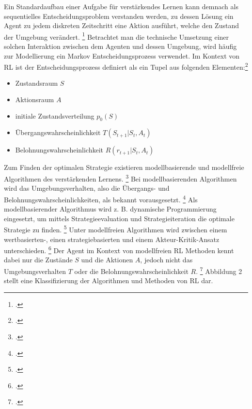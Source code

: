 Ein Standardaufbau einer Aufgabe für verstärkendes Lernen kann demnach als sequentielles Entscheidungsproblem verstanden werden, zu dessen Lösung ein Agent zu jedem diskreten Zeitschritt eine Aktion ausführt, welche den Zustand der Umgebung verändert. \footcite[Vgl.][S. 2]{Zhao.2020}
Betrachtet man die technische Umsetzung einer solchen Interaktion zwischen dem Agenten und dessen Umgebung, wird häufig zur Modellierung ein Markov Entscheidungsprozess verwendet.
Im Kontext von RL ist der Entscheidungsprozess definiert als ein Tupel aus folgenden Elementen:\footcite[Vgl.][S. 2]{Zhang.2018}
\begin{itemize}
    \item Zustandsraum $S$
    \item Aktionsraum $A$
    \item initiale Zustandsverteilung $p_{0}(S)$
    \item Übergangswahrscheinlichkeit $T(S_{t+1}|S_{t},A_{t})$
    \item Belohnungswahrscheinlichkeit $R(r_{t+1}|S_{t},A_{t})$
\end{itemize}

Zum Finden der optimalen Strategie existieren modellbasierende und modellfreie Algorithmen des verstärkenden Lernens. \footcite[Vgl.][S. 3]{Wang.2020}
Bei modellbasierenden Algorithmen wird das Umgebungsverhalten, also die Übergangs- und Belohnungswahrscheinlichkeiten, als bekannt vorausgesetzt. \footcite[Vgl.][S. 3]{Wang.2020}
Als modellbasierender Algorithmus wird z. B. dynamische Programmierung eingesetzt, um mittels Strategieevaluation und Strategieiteration die optimale Strategie zu finden. \footcite[Vgl.][S. 5]{Li.2019}
Unter modellfreien Algorithmen wird zwischen einem wertbasierten-, einen strategiebasierten und einem Akteur-Kritik-Ansatz unterschieden. \footcite[Vgl.][S. 5]{Li.2019}
Der Agent im Kontext von modellfreien RL Methoden kennt dabei nur die Zustände $S$ und die Aktionen $A$, jedoch nicht das Umgebungsverhalten $T$ oder die Belohnungswahrscheinlichkeit $R$. \footcite[Vgl.][S. 2]{Cutler.2014}
Abbildung 2 stellt eine Klassifizierung der Algorithmen und Methoden von RL dar.

